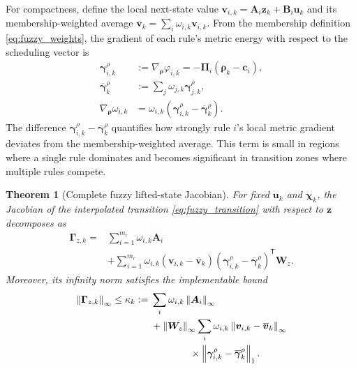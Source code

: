 \documentclass[journal]{IEEEtran}
\newtheorem{theorem}{Theorem}
\newcommand{\norm}[1]{\left\lVert #1\right\rVert}
\newcommand{\T}{\mathsf T}
\newcommand{\1}{\bm 1}
\begin{document}
For compactness, define the local next-state value $\bm v_{i,k}=\bm
A_i\bm z_k+\bm B_i\bm u_k$ and its membership-weighted average $\overline{\bm
v}_k=\sum_i\omega_{i,k}\bm v_{i,k}$. From the membership definition
\eqref{eq:fuzzy_weights}, the gradient of each rule's metric energy with
respect to the scheduling vector is
\begin{equation}
\begin{aligned}
\bm\gamma_{i,k}^{\rho}
&:=\nabla_{\bm\rho}\varphi_{i,k}
=-\bm\Pi_i(\bm\rho_k-\bm c_i),\\
\overline{\bm\gamma}_k^{\rho}
&:=\sum_j\omega_{j,k}\bm\gamma_{j,k}^{\rho},\\
\nabla_{\bm\rho}\omega_{i,k}
&=\omega_{i,k}
(\bm\gamma_{i,k}^{\rho}-\overline{\bm\gamma}_k^{\rho}).
\end{aligned}
\label{eq:weight_gradient}
\end{equation}
The difference $\bm\gamma_{i,k}^{\rho}-\overline{\bm\gamma}_k^{\rho}$
quantifies how strongly rule $i$'s local metric gradient deviates from the
membership-weighted average. This term is small in regions where a single rule
dominates and becomes significant in transition zones where multiple rules
compete.

\begin{theorem}[Complete fuzzy lifted-state Jacobian]
\label{thm:jacobian}
For fixed $\bm u_k$ and $\bm\chi_k$, the Jacobian of the interpolated
transition \eqref{eq:fuzzy_transition} with respect to $\bm z$ decomposes as
\begin{equation}
\begin{aligned}
\bm\Gamma_{z,k}
={}&\sum_{i=1}^{m_r}\omega_{i,k}\bm A_i\\
&+\sum_{i=1}^{m_r}\omega_{i,k}
(\bm v_{i,k}-\overline{\bm v}_k)
(\bm\gamma_{i,k}^{\rho}
-\overline{\bm\gamma}_k^{\rho})^\T\bm W_z .
\end{aligned}
\label{eq:complete_jacobian}
\end{equation}
Moreover, its infinity norm satisfies the implementable bound
\begin{equation}
\begin{aligned}
\norm{\bm\Gamma_{z,k}}_\infty\leq\kappa_k:={}&
\sum_i\omega_{i,k}\norm{\bm A_i}_\infty\\
&+\norm{\bm W_z}_\infty
\sum_i\omega_{i,k}
\norm{\bm v_{i,k}-\overline{\bm v}_k}_\infty\\
&\hspace{14mm}\times
\norm{\bm\gamma_{i,k}^{\rho}
-\overline{\bm\gamma}_k^{\rho}}_1 .
\end{aligned}
\label{eq:jacobian_bound}
\end{equation}
\end{theorem}
\end{document}
